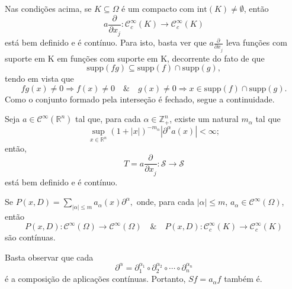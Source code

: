 \documentclass[../distribution_theory_notes.tex]{subfiles}
\begin{document}
 \begin{example}
   Nas condições acima, se \(K\subseteq \Omega \) é um compacto com \(\mathrm{int}(K)\neq\emptyset\), então 
     \[
       a \frac{\partial^{}}{\partial x_{j}^{}}:\mathcal{C}_{c}^{\infty}(K)\rightarrow \mathcal{C}_{c}^{\infty}(K)
     \]
     está bem definido e é contínuo. Para isto, basta ver que \(a \frac{\partial^{}}{\partial x_{j}^{}}\) leva funções com suporte em K em funções com suporte em K, decorrente do fato de que 
       \[
         \mathrm{supp}(fg)\subseteq \mathrm{supp}(f)\cap \mathrm{supp}(g),
       \]
       tendo em vista que 
         \[
           fg(x)\neq 0 \Rightarrow f(x)\neq 0 \quad\&\quad g(x)\neq 0 \Rightarrow x\in \mathrm{supp}(f)\cap \mathrm{supp}(g).
         \]
        Como o conjunto formado pela interseção é fechado, segue a continuidade.
 \end{example}
\begin{example}
  Seja \(a\in \mathcal{C}^{\infty}(\mathbb{R}^{n})\) tal que, para cada \(\alpha \in \mathbb{Z}_{+}^{n}\), existe um natural \(m_{\alpha }\) tal que 
    \[
      \sup_{x\in \mathbb{R}^{n}}(1+|x|)^{-m_{\alpha }}|\partial^{\alpha }a(x)|<\infty;
    \]
    então, 
      \[
        T = a \frac{\partial^{}}{\partial x_{j}^{}}:\mathcal{S}\rightarrow \mathcal{S}
      \]
      está bem definido e é contínuo.
\end{example}
\begin{theorem*}
  Se \(P(x, D)=\sum\limits_{|\alpha |\leq m}^{}a_{\alpha }(x)\partial^{\alpha },\) onde, para cada \(|\alpha |\leq m\), \(a_{\alpha }\in \mathcal{C}^{\infty}(\Omega )\), então 
    \[
      P(x, D):\mathcal{C}^{\infty}(\Omega )\rightarrow \mathcal{C}^{\infty}(\Omega ) \quad\&\quad  P(x, D):\mathcal{C}_{c}^{\infty}(K )\rightarrow \mathcal{C}_{c}^{\infty}(K )
    \]
    são contínuas.
\end{theorem*}
\begin{proof*}
  Basta observar que cada 
    \[
      \partial^{\alpha }=\partial_{1}^{\alpha_{1}} \circ\partial_{2}^{\alpha_{2}} \circ\cdots\circ \partial_{n}^{\alpha_{n}}
    \]
    é a composição de aplicações contínuas. Portanto, \(Sf=a_{\alpha }f\) também é. \qedsymbol
\end{proof*}
\end{document}
